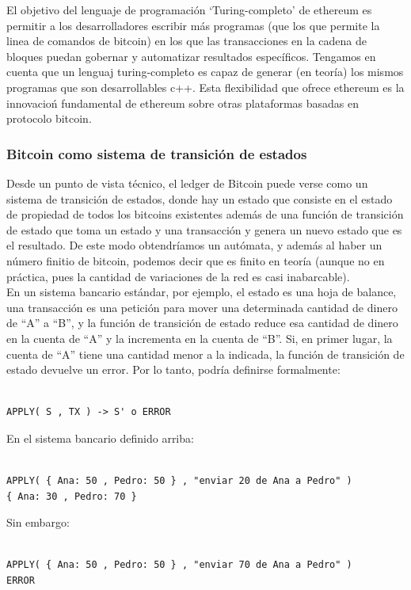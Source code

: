 \documentclass[11pt,a4paper]{article}
\begin{document}
El objetivo del lenguaje de programación ‘Turing-completo’ de ethereum es permitir a los
desarrolladores escribir más programas (que los que permite la linea de comandos de bitcoin) en los que las transacciones en la cadena de bloques puedan gobernar y automatizar resultados específicos. Tengamos en cuenta que un lenguaj turing-completo es capaz de generar (en teoría) los mismos programas que son desarrollables c++. Esta flexibilidad que ofrece ethereum es  la innovacioń fundamental de ethereum sobre otras plataformas basadas en protocolo bitcoin.\\

\subsubsection{Bitcoin como sistema de transición de estados}

Desde un punto de vista técnico, el ledger de Bitcoin puede verse como un sistema de
transición de estados, donde hay un estado que consiste en el estado de propiedad de todos los bitcoins existentes además de una función de transición de estado que toma un estado y una transacción y genera un nuevo estado que es el resultado. De este modo obtendríamos un autómata, y además al haber un número finitio de bitcoin, podemos decir que es finito en teoría (aunque no en práctica, pues la cantidad de variaciones de la red es casi inabarcable).\\

 En un sistema bancario estándar, por ejemplo, el estado es una hoja de balance, una transacción es una petición para mover una determinada cantidad de dinero de “A” a “B”, y la función de transición de estado reduce esa cantidad de dinero en la cuenta de “A” y la incrementa en la cuenta de “B”. Si, en primer lugar, la cuenta de “A” tiene una cantidad menor a la indicada, la función de transición de estado devuelve un error. Por lo tanto, podría definirse formalmente:
\begin{lstlisting}

APPLY( S , TX ) -> S' o ERROR

\end{lstlisting}


En el sistema bancario definido arriba:
\begin{lstlisting}

APPLY( { Ana: 50 , Pedro: 50 } , "enviar 20 de Ana a Pedro" ) 
{ Ana: 30 , Pedro: 70 }

\end{lstlisting}
Sin embargo:
\begin{lstlisting}

APPLY( { Ana: 50 , Pedro: 50 } , "enviar 70 de Ana a Pedro" ) 
ERROR

\end{lstlisting}
\end{document}
